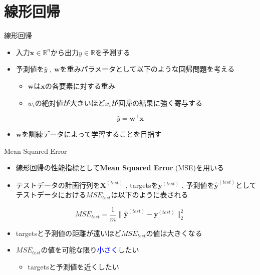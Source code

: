 \documentclass[dvipdfmx, 10pt]{beamer}
\begin{document}

\section{線形回帰}

\begin{frame}{線形回帰}
  \begin{itemize}
    \item 入力$\bm{x} \in \mathbb{R} ^ {n}$から出力$y \in \mathbb{R}$を予測する
    \item 予測値を$\hat{y}$ , $\bm{w}$を重みパラメータとして以下のような回帰問題を考える
    \begin{itemize}
      \item $\bm{w}$は$\bm{x}$の各要素に対する重み
      \item $w_{i}$の絶対値が大きいほど$x_{i}$が回帰の結果に強く寄与する
    \end{itemize}
  \end{itemize}
  \begin{equation}
    \hat{y} = \bm{w} ^ {\top} \bm{x}
  \end{equation}
  \begin{itemize}
    \item $\bm{w}$を訓練データによって学習することを目指す
  \end{itemize}
\end{frame}


\begin{frame}{Mean Squared Error}
  \begin{itemize}
    \item 線形回帰の性能指標として{\bf Mean Squared Error} (MSE)を用いる
    \item テストデータの計画行列を$\bm{X} ^ {(test)}$ , targetsを$\bm{y} ^ {(test)}$ , 予測値を$\hat{\bm{y}} ^ {(test)}$としてテストデータにおける$MSE_{test}$は以下のように表される
  \end{itemize}
  \begin{equation}
    MSE_{test} = \dfrac{1} {m} \| \hat{\bm{y}} ^ {(test)} - \bm{y} ^ {(test)} \| _{2}^{2}
  \end{equation}
  \begin{itemize}
    \item targetsと予測値の距離が遠いほど$MSE_{test}$の値は大きくなる
    \item $MSE_{test}$の値を可能な限り\textcolor{blue}{小さく}したい
    \begin{itemize}
      \item targetsと予測値を近くしたい
    \end{itemize}
  \end{itemize}
\end{frame}
\end{document}
